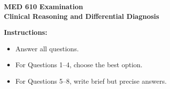 \documentclass[11pt]{article}
\begin{document}
\begin{center}
  {\Large \textbf{MED 610 Examination}}\\[0.25em]
  {\large \textbf{Clinical Reasoning and Differential Diagnosis}}\\[0.5em]
\end{center}

\noindent\textbf{Instructions:}
\begin{itemize}
  \item Answer all questions.
  \item For Questions 1--4, choose the best option.
  \item For Questions 5--8, write brief but precise answers.
\end{itemize}

\vspace{0.5em}
\end{document}
